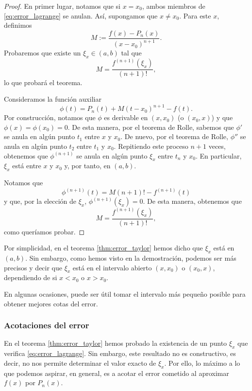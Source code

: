     \begin{proof}
      En primer lugar, notamos que si $x = x_0$, ambos miembros de
      \ref{eq:error_lagrange} se anulan. Así, supongamos que $x \neq x_0$.
      Para este $x$, definimos
      \[
        M := \frac{f(x) - P_n(x)}{(x - x_0)^{n+1}}.
      \]
      Probaremos que existe un $\xi_x \in (a, b)$ tal que
      \[
        M = \frac{f^{(n+1)}(\xi_x)}{(n+1)!},
      \]
      lo que probará el teorema.

      Consideramos la función auxiliar
      \[
        \phi(t) = P_n(t) + M (t - x_0)^{n+1} - f(t).
      \]
      Por construcción, notamos que $\phi$ es derivable en $(x, x_0)$ (o
      $(x_0, x)$) y que $\phi(x) = \phi(x_0) = 0$. De esta manera, por el
      teorema de Rolle, sabemos que $\phi'$ se anula en algún punto $t_1$
      entre $x$ y $x_0$. De nuevo, por el teorema de Rolle, $\phi''$ se
      anula en algún punto $t_2$ entre $t_1$ y $x_0$. Repitiendo este
      proceso $n + 1$ veces, obtenemos que $\phi^{(n+1)}$ se anula en algún
      punto $\xi_x$ entre $t_n$ y $x_0$. En particular, $\xi_x$ está entre
      $x$ y $x_0$ y, por tanto, en $(a, b)$.

      Notamos que
      \[
        \phi^{(n+1)}(t) = M (n+1)! - f^{(n+1)}(t)
      \]
      y que, por la elección de $\xi_x$, $\phi^{(n+1)}(\xi_x) = 0$. De
      esta manera, obtenemos que
      \[
        M = \frac{f^{(n+1)}(\xi_x)}{(n+1)!},
      \]
      como queríamos probar.
    \end{proof}

    \begin{remark} \label{rmk:error_taylor}
      Por simplicidad, en el teorema \ref{thm:error_taylor} hemos dicho que
      $\xi_x$ está en $(a, b)$. Sin embargo, como hemos visto en la
      demostración, podemos ser más precisos y decir que $\xi_x$ está en el
      intervalo abierto $(x, x_0)$ o $(x_0, x)$, dependiendo de si $x <
      x_0$ o $x > x_0$.

      En algunas ocasiones, puede ser útil tomar el intervalo más
      pequeño posible para obtener mejores cotas del error.
    \end{remark}

    \subsubsection{Acotaciones del error}
      En el teorema \ref{thm:error_taylor} hemos probado la existencia de
      un punto $\xi_x$ que verifica \ref{eq:error_lagrange}. Sin embargo,
      este resultado no es constructivo, es decir, no nos permite
      determinar el valor exacto de $\xi_x$. Por ello, lo máximo a lo que
      podemos aspirar, en general, es a acotar el error cometido al
      aproximar $f(x)$ por $P_n(x)$.


